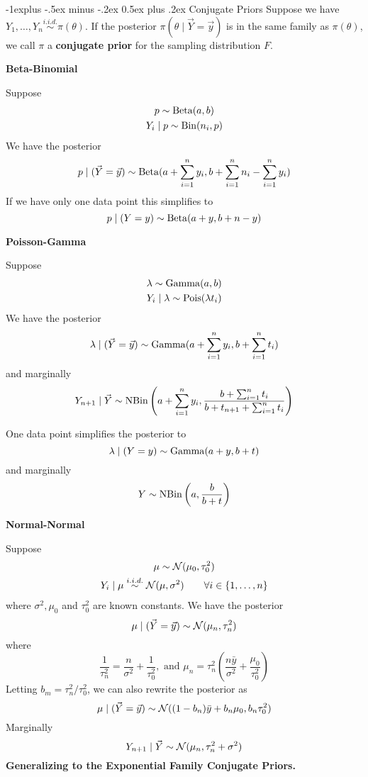 \documentclass[10pt,landscape]{article}
\makeatletter
\renewcommand{\subsection}{\@startsection{subsection}{2}{0mm}%
                                {-1explus -.5ex minus -.2ex}%
                                {0.5ex plus .2ex}%
                                {\normalfont\normalsize\bfseries}}
\makeatother
\begin{document}
\begin{multicols*}{3}
\subsection{Conjugate Priors}
Suppose we have $Y_1,\ldots,Y_n\stackrel{i.i.d.}{\sim} \pi(\theta)$. If the posterior $\pi(\theta\mid\vec Y=\vec y)$ is in the same family as $\pi(\theta)$, we call $\pi$ a \textbf{conjugate prior} for the sampling distribution $F$.

\textbf{Beta-Binomial}

Suppose 
\begin{gather*}
p\sim \operatorname{Beta}(a,b)\\
    Y_i\mid p\sim \operatorname{Bin}(n_i,p)
\end{gather*}
We have the posterior
$$
p\mid (\vec Y=\vec y)\sim \operatorname{Beta}(a+\sum_{i=1}^n y_i,b+\sum_{i=1}^n n_i-\sum_{i=1}^n y_i)
$$
If we have only one data point this simplifies to
$$
p\mid (Y=y)\sim \operatorname{Beta}(a+y,b+n-y)
$$

\textbf{Poisson-Gamma}

Suppose 
\begin{gather*}
\lambda \sim \operatorname{Gamma}(a,b)\\
Y_i\mid \lambda \sim \operatorname{Pois}(\lambda t_i)
\end{gather*}
We have the posterior
$$
\lambda\mid (\vec Y=\vec y)\sim \operatorname{Gamma}(a+\sum_{i=1}^ny_i,b+\sum_{i=1}^nt_i)
$$
and marginally
$$
Y_{n+1}\mid\vec Y \sim \operatorname{NBin}\left(a+\sum_{i=1}^ny_i,\frac{b+\sum_{i=1}^nt_i}{b+t_{n+1}+\sum_{i=1}^nt_i}\right)
$$

One data point simplifies the posterior to
$$
\lambda\mid (Y=y)\sim \operatorname{Gamma}(a+y,b+t)
$$
and marginally
$$
Y\sim \operatorname{NBin}\left(a,\frac{b}{b+t}\right)
$$

\textbf{Normal-Normal}

Suppose 
\begin{gather*}
\mu \sim \mathcal{N}(\mu_0,\tau_0^2)\\
Y_i\mid \mu \stackrel{i.i.d.}{\sim} \mathcal{N}(\mu, \sigma^2)\qquad\forall i\in\{1,\ldots,n\}
\end{gather*}
where $\sigma^2,\mu_0$ and $\tau_0^2$ are known constants. We have the posterior
$$
\mu\mid (\vec Y=\vec y)\sim \mathcal{N}(\mu_n,\tau_n^2)
$$
where
$$
\frac{1}{\tau_n^2}=\frac{n}{\sigma^2}+\frac{1}{\tau_0^2},\text{ and } \mu_n=\tau_n^2\left(\frac{n\bar y}{\sigma^2}+\frac{\mu_0}{\tau_0^2}\right)
$$
Letting $b_m=\tau^2_n/\tau_0^2$, we can also rewrite the posterior as
$$
\mu\mid(\vec Y=\vec y)\sim \mathcal{N}((1-b_n)\bar y+b_n\mu_0,b_n\tau_0^2)
$$
Marginally
$$
Y_{n+1}\mid\vec Y\sim\mathcal{N}(\mu_n,\tau_n^2+\sigma^2)
$$
\textbf{Generalizing to the Exponential Family Conjugate Priors. }


\end{multicols*}
\end{document}
